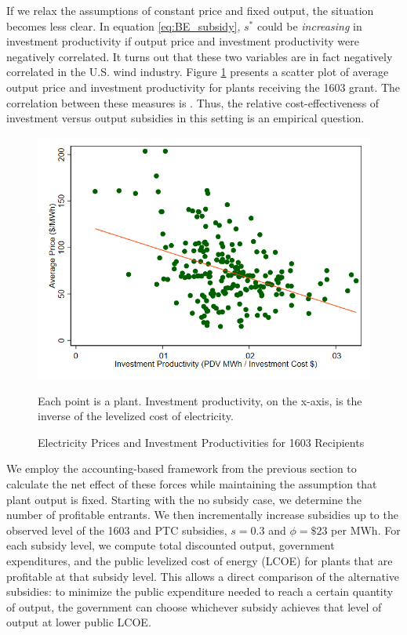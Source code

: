 \documentclass[12pt]{article}
\begin{document}
If we relax the assumptions of constant price and fixed output, the situation becomes less clear. In equation \ref{eq:BE_subsidy}, $s^*$ could be \emph{increasing} in investment productivity if output price and investment productivity were negatively correlated. It turns out that these two variables are in fact negatively correlated in the U.S. wind industry. Figure \ref{fig:price_vs_capprod_1603} presents a scatter plot of average output price and investment productivity for plants receiving the 1603 grant. The correlation between these measures is \unskip. Thus, the relative cost-effectiveness of investment versus output subsidies in this setting is an empirical question. 

\begin{figure}[htbp] 
  \begin{center}
  \caption{Electricity Prices and Investment Productivities for 1603 Recipients \label{fig:price_vs_capprod_1603}}
  \includegraphics[width=0.75\linewidth]{price_vs_capprod_1603.png}
  \end{center}
  \vspace{-15pt}
  \footnotesize
  Each point is a plant. Investment productivity, on the x-axis, is the inverse of the levelized cost of electricity.
\end{figure}

We employ the accounting-based framework from the previous section to calculate the net effect of these forces while maintaining the assumption that plant output is fixed. Starting with the no subsidy case, we determine the number of profitable entrants. We then incrementally increase subsidies up to the observed level of the 1603 and PTC subsidies, $s=0.3$ and $\phi=\$23$ per MWh. For each subsidy level, we compute total discounted output, government expenditures, and the public levelized cost of energy (LCOE) for plants that are profitable at that subsidy level. This allows a direct comparison of the alternative subsidies: to minimize the public expenditure needed to reach a certain quantity of output, the government can choose whichever subsidy achieves that level of output at lower public LCOE.
\end{document}
